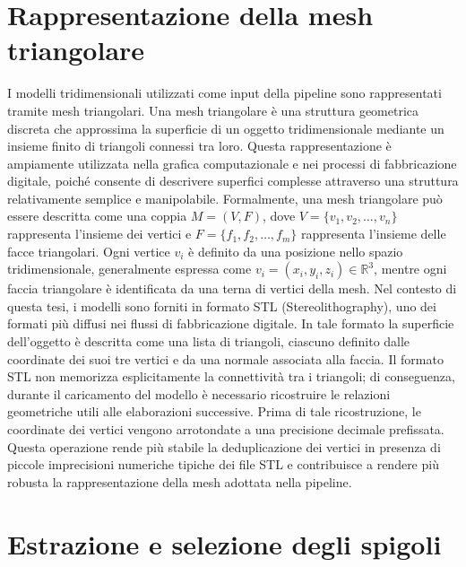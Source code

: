 \documentclass[a4paper,11pt,titlepage,twoside]{book}
\newcommand{\1}{\mathbf{1}}
\numberwithin{equation}{chapter}
\theoremstyle{plain}
\theoremstyle{definition}
\begin{document}
	\section{Rappresentazione della mesh triangolare}
	
	I modelli tridimensionali utilizzati come input della pipeline sono rappresentati tramite mesh triangolari. Una mesh triangolare è una struttura geometrica discreta che approssima la superficie di un oggetto tridimensionale mediante un insieme finito di triangoli connessi tra loro\cite{Botsch2010}. Questa rappresentazione è ampiamente utilizzata nella grafica computazionale e nei processi di fabbricazione digitale, poiché consente di descrivere superfici complesse attraverso una struttura relativamente semplice e manipolabile\cite{Botsch2010}.
	Formalmente, una mesh triangolare può essere descritta come una coppia \(M = (V, F)\), dove \(V = \{v_1, v_2, \dots, v_n\}\) rappresenta l’insieme dei vertici e \(F = \{f_1, f_2, \dots, f_m\}\) rappresenta l’insieme delle facce triangolari. Ogni vertice \(v_i\) è definito da una posizione nello spazio tridimensionale, generalmente espressa come \(v_i = (x_i, y_i, z_i) \in \mathbb{R}^3\), mentre ogni faccia triangolare è identificata da una terna di vertici della mesh.
	Nel contesto di questa tesi, i modelli sono forniti in formato STL (Stereolithography), uno dei formati più diffusi nei flussi di fabbricazione digitale. In tale formato la superficie dell’oggetto è descritta come una lista di triangoli, ciascuno definito dalle coordinate dei suoi tre vertici e da una normale associata alla faccia. Il formato STL non memorizza esplicitamente la connettività tra i triangoli; di conseguenza, durante il caricamento del modello è necessario ricostruire le relazioni geometriche utili alle elaborazioni successive.
	Prima di tale ricostruzione, le coordinate dei vertici vengono arrotondate a una precisione decimale prefissata. Questa operazione rende più stabile la deduplicazione dei vertici in presenza di piccole imprecisioni numeriche tipiche dei file STL e contribuisce a rendere più robusta la rappresentazione della mesh adottata nella pipeline.
	
	\section{Estrazione e selezione degli spigoli}
	
\end{document}
